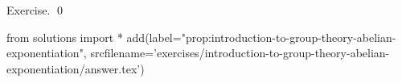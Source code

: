 
\begin{prop}
  \label{prop:introduction-to-group-theory-abelian-exponentiation}
  
\end{prop}
\proof
Exercise.
\qed
\begin{python0}
from solutions import *
add(label="prop:introduction-to-group-theory-abelian-exponentiation",
    srcfilename='exercises/introduction-to-group-theory-abelian-exponentiation/answer.tex') 
\end{python0}
